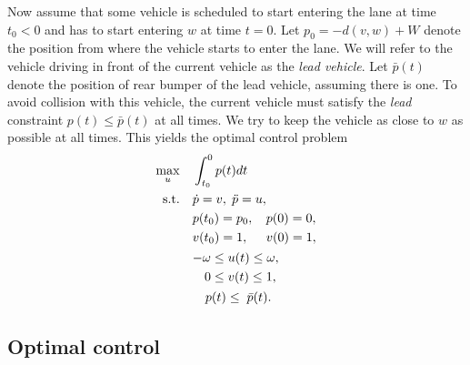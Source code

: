 \documentclass[a4paper]{article}
\theoremstyle{definition}
\theoremstyle{plain}
\begin{document}
Now assume that some vehicle is scheduled to start entering the lane at time
$t_{0} < 0$ and has to start entering $w$ at time $t=0$. Let
$p_{0} = -d(v,w) + W$ denote the position from where the vehicle starts to enter
the lane.
%
We will refer to the vehicle driving in front of the current vehicle as the
\emph{lead vehicle}. Let $\bar{p}(t)$ denote the position of rear bumper of the lead vehicle,
assuming there is one.
%
To avoid collision with this vehicle, the current vehicle must satisfy the \textit{lead}
constraint $p(t) \leq \bar{p}(t)$ at all times.
%
We try to keep the vehicle as close to $w$ as possible at all times. This yields
the optimal control problem
\begin{equation}
  \label{eq:optimal_control}
  \begin{aligned}
  \max_{u}    \quad & \int_{t_{0}}^{0} p(t) dt \\
    \begin{alignedat}{2}\text{s.t.}\\\\ {}\end{alignedat}
              \quad &\begin{alignedat}{2}
                     &\dot{p}=v, \; \ddot{p} = u , \\
                     &p(t_{0}) = p_{0} , \;\; &&  p(0) = 0 , \\
                     &v(t_{0}) = 1 ,  && v(0) = 1 , \\
                    \end{alignedat} \\
                    &\begin{alignedat}[t]{2}
                     {-\omega} \leq \; &u(t) \leq \omega , \\
                     0 \leq \; &v(t) \leq 1 , \\
                    \end{alignedat} \\
                    &\quad p(t) \leq \; \bar{p}(t) .
  \end{aligned}
\end{equation}


\subsection{Optimal control}
\end{document}
